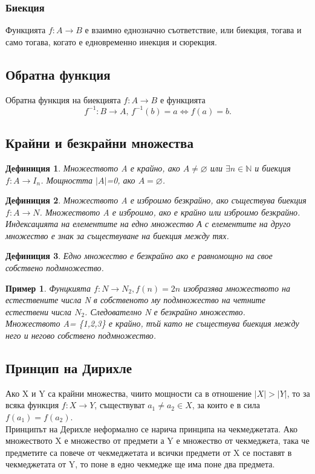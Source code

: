 \documentclass[fleqn, 12pt]{article}
\newtheorem{example}{Пример}[subsection]
\newtheorem{definition}{Дефиниция}[subsection]
\begin{document}
\subsubsection{Биекция}
Функцията $f: A \rightarrow B$ е взаимно еднозначно съответствие, или биекция, тогава и само тогава, когато е едновременно инекция и сюрекция.

\subsection{Обратна функция}
Обратна функция на биекцията $f: A \rightarrow B$ е функцията 
$$f^{-1}:B \rightarrow A, \, f^{-1}(b) = a \Leftrightarrow f(a) = b.$$

\subsection{Крайни и безкрайни множества}

\begin{definition}
Множеството A е крайно, ако $ A \neq \varnothing $ или $\exists n \in \mathbb{N} $ и биекция $f: A \rightarrow I_n$. Мощността $\vert A \vert $=0, ако $ A = \varnothing $.
\end{definition}

\begin{definition}
Множеството A е изброимо безкрайно, ако съществува биекция $f: A \rightarrow N$. Множеството A е изброимо, ако е крайно или изброимо безкрайно. \\
Индексацията на елементите на едно множество А с елементите на друго множество е знак за съществуване на биекция между тях. 
\end{definition}

\begin{definition}
Едно множество е безкрайно ако е равномощно на свое собствено подмножество.
\end{definition}

\begin{example}
Фунцкията $f: N \rightarrow N_2, f(n) = 2n$ изобразява множеството на естествените числа N в собственото му подмножество на четните естествени числа $N_2$. Следователно 
N е безкрайно множество. \\
Множеството A= \{1,2,3\} е крайно, тъй като не съществува биекция между него и негово собствено подмножество.
\end{example}

\subsection{Принцип на Дирихле}
Ако X и Y са крайни множества, чиито мощности са в отношение $ \vert X \vert > \vert Y \vert $, то за всяка функция $f: X \rightarrow Y$, съществуват $a_1 \neq a_2 \in X$, за които е в сила $f(a_1)=f(a_2)$.\\
Принципът на Дерихле неформално се нарича принципа на чекмеджетата. Ако множеството X е множество от предмети а Y е множество от чекмеджета, така че предметите са повече от чекмеджетата и всички предмети от X се поставят в чекмеджетата от Y, то поне в едно чекмедже ще има поне два предмета.
\end{document}

